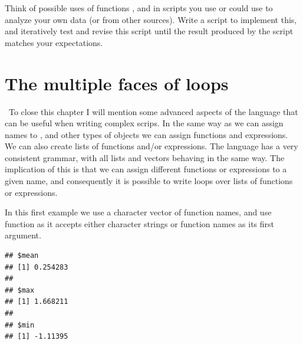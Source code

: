 \documentclass[krantz2]{krantz}\usepackage{knitr}%
\begin{document}
\begin{advplayground}
Think of possible uses of functions ,  and  in scripts you use or could use to analyze your own data (or from other sources). Write a script to implement this, and iteratively test and revise this script until the result produced by the script matches your expectations.
\end{advplayground}

\section{The multiple faces of loops}

\ilAdvanced\ To close this chapter I will mention some advanced aspects of the \Rlang language that can be useful when writing complex scrips. In the same way as we can assign names to ,  and other types of objects we can assign functions and expressions. We can also create lists of functions and/or expressions. The \Rlang language has a very consistent grammar, with all lists and vectors behaving in the same way. The implication of this is that we can assign different functions or expressions to a given name, and consequently it is possible to write loops over lists of functions or expressions.

In this first example we use a character vector of function names, and use function  as it accepts either character strings or function names as its first argument.
\begin{knitrout}\footnotesize
{}\color{fgcolor}\begin{kframe}
\begin{alltt}
 \hlkwb{<-} \hlstd{(}\hlstd{)}
 \hlkwb{<-} \hlstd{()}
 \hlkwb{<-} \hlstd{(}\hlstd{,} \hlstd{,} \hlstd{)}
   
    \hlkwb{<-}  
   \hlstd{\}}
\end{alltt}
\begin{verbatim}
## $mean
## [1] 0.254283
## 
## $max
## [1] 1.668211
## 
## $min
## [1] -1.11395
\end{verbatim}
\end{kframe}
\end{knitrout}
\end{document}
